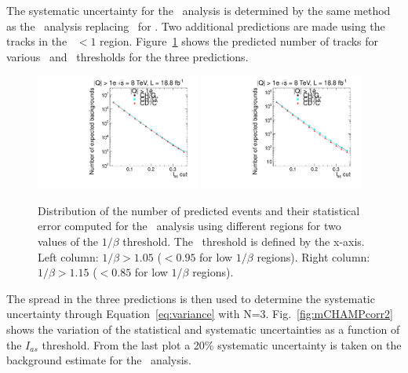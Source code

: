 The systematic uncertainty for the \multi\ analysis is determined by the same method as the \muononly\ analysis replacing \pt\ for \ias. 
Two additional predictions are made using the tracks in the \invbeta\ $< 1$ region.
Figure~\ref{fig:mCHAMPcorr} shows the predicted number of tracks for various \invbeta\ and \dedx\ thresholds for the three predictions.

\begin{figure}%
 \begin{center}
 \includegraphics[clip=false, trim=0.0cm 0cm 0.0cm 0cm, width=0.48\textwidth]{figures/multi/Data8TeVCollisionPrediction_TOF105}
 \includegraphics[clip=false, trim=0.0cm 0cm 0.0cm 0cm, width=0.48\textwidth]{figures/multi/Data8TeVCollisionPrediction_TOF115}
 \end{center}
 \caption[Distribution of the number of predicted events from different predictions in the \multi\ analysis]
{Distribution of the number of predicted events and their
   statistical error computed for the \multi\ analysis using
   different regions for two values of the $1/\beta$ threshold. The \ias\ threshold is defined by the x-axis.
Left column: $1/\beta>1.05$ ($<0.95$ for low $1/\beta$ regions). Right
column: $1/\beta>1.15$ ($<0.85$ for low $1/\beta$ regions).}
 \label{fig:mCHAMPcorr}
\end{figure}

The spread in the three predictions is then used to determine the systematic uncertainty through Equation~\ref{eq:variance} with N=3.
Fig.~\ref{fig:mCHAMPcorr2} shows the variation of the statistical and systematic uncertainties as a function of the $I_{as}$ threshold.
From the last plot a 20\% systematic uncertainty is taken on the background estimate for the \multi\ analysis.

